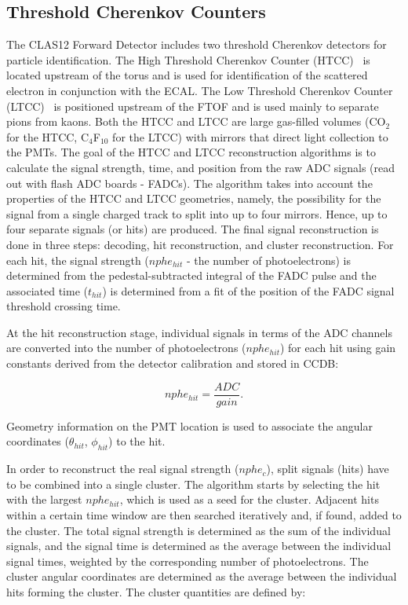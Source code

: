 \subsection{Threshold Cherenkov Counters}

The CLAS12 Forward Detector includes two threshold Cherenkov detectors for particle identification. The
High Threshold Cherenkov Counter (HTCC)~\cite{htcc-nim} is located upstream of the torus and is used for
identification of the scattered electron in conjunction with the ECAL. The Low Threshold Cherenkov Counter
(LTCC)~\cite{ltcc-nim} is positioned upstream of the FTOF and is used mainly to separate pions from kaons.
Both the HTCC and LTCC are large gas-filled volumes (CO$_2$ for the HTCC, C$_4$F$_{10}$ for the LTCC)
with mirrors that direct light collection to the PMTs. The goal of the HTCC and LTCC reconstruction algorithms
is to calculate the signal strength, time, and position from the raw ADC signals (read out with flash ADC boards
- FADCs). The algorithm takes into account the properties of the HTCC and LTCC geometries, namely, the
possibility for the signal from a single charged track to split into up to four mirrors. Hence, up to four separate
signals (or hits) are produced. The final signal reconstruction is done in three steps: decoding, hit reconstruction,
and cluster reconstruction. For each hit, the signal strength ($nphe_{hit}$ - the number of photoelectrons) is
determined from the pedestal-subtracted integral of the FADC pulse and the associated time ($t_{hit}$) is
determined from a fit of the position of the FADC signal threshold crossing time.

At the hit reconstruction stage, individual signals in terms of the ADC channels are converted into the number of
photoelectrons ($nphe_{hit}$) for each hit using gain constants derived from the detector calibration and stored
in CCDB:

\begin{equation}
nphe_{hit} = \frac{ADC}{gain}.
\end{equation}

\noindent
Geometry information on the PMT location is used to associate the angular coordinates ($\theta_{hit}$, $\phi_{hit}$)
to the hit.

In order to reconstruct the real signal strength ($nphe_c$), split signals (hits) have to be combined into a single
cluster. The algorithm starts by selecting the hit with the largest $nphe_{hit}$, which is used as a seed for the
cluster. Adjacent hits within a certain time window are then searched iteratively and, if found, added to the
cluster. The total signal strength is determined as the sum of the individual signals, and the signal time is
determined as the average between the individual signal times, weighted by the corresponding number of
photoelectrons. The cluster angular coordinates are determined as the average between the individual hits forming
the cluster. The cluster quantities are defined by:

